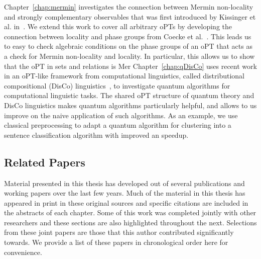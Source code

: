 Chapter~\ref{chap:mermin} investigates the connection between Mermin non-locality and strongly complementary observables that was first introduced by Kissinger et al. in~\cite{coecke2012strong}. We extend this work to cover all arbitrary oPTs by developing the connection between locality and phase groups from Coecke et al.~\cite{coecke2011phase}. This leads us to easy to check algebraic conditions on the phase groups of an oPT that acts as a check for Mermin non-locality and locality. In particular, this allows us to show that the oPT in sets and relations is Mer
Chapter~\ref{chap:qDisCo} uses recent work in an oPT-like framework from computational linguistics, called distributional compositional (DisCo) linguistics~\cite{clark2008compositional}, to investigate quantum algorithms for computational linguistic tasks. The shared oPT structure of quantum theory and DisCo linguistics makes quantum algorithms particularly helpful, and allows to us improve on the naive application of such algorithms. As an example, we use classical preprocessing to adapt a quantum algorithm for clustering into a sentence classification algorithm with improved an speedup.

 
\subsection*{Related Papers}

Material presented in this thesis has developed out of several publications and working papers over the last few years. Much of the material in this thesis has appeared in print in these original sources and specific citations are included in the abstracts of each chapter. Some of this work was completed jointly with other researchers and these sections are also highlighted throughout the next.  Selections from these joint papers are those that this author contributed significantly towards. We provide a list of these papers in chronological order here for convenience.

